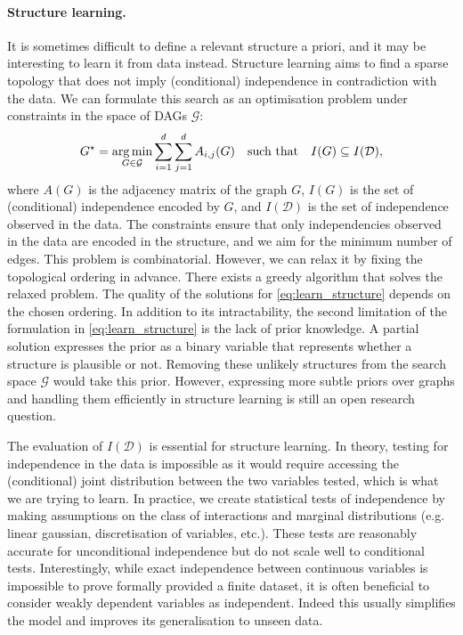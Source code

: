 \paragraph{Structure learning.}
It is sometimes difficult to define a relevant structure a priori, and it may be interesting to learn it from data instead. Structure learning aims to find a sparse topology that does not imply (conditional) independence in contradiction with the data. We can formulate this search as an optimisation problem under constraints in the space of DAGs $\mathcal{G}$:
\begin{align}
 G^\star = \operatorname*{arg\,min}_{G \in \mathcal{G}} \sum_{i=1}^d\sum_{j=1}^d A_{i,j}(G) \quad \text{such that} \quad I(G) \subseteq I(\mathcal{D}), \label{eq:learn_structure}
\end{align}
where $A(G)$ is the adjacency matrix of the graph $G$, $I(G)$ is the set of (conditional) independence encoded by $G$, and $I(\mathcal{D})$ is the set of independence observed in the data. The constraints ensure that only independencies observed in the data are encoded in the structure, and we aim for the minimum number of edges. This problem is combinatorial. However, we can relax it by fixing the topological ordering in advance. There exists a greedy algorithm that solves the relaxed problem. The quality of the solutions for \eqref{eq:learn_structure} depends on the chosen ordering. In addition to its intractability, the second limitation of the formulation in \eqref{eq:learn_structure} is the lack of prior knowledge. A partial solution expresses the prior as a binary variable that represents whether a structure is plausible or not. Removing these unlikely structures from the search space $\mathcal{G}$ would take this prior. However, expressing more subtle priors over graphs and handling them efficiently in structure learning is still an open research question.

The evaluation of $I(\mathcal{D})$ is essential for structure learning. In theory, testing for independence in the data is impossible as it would require accessing the (conditional) joint distribution between the two variables tested, which is what we are trying to learn. In practice, we create statistical tests of independence by making assumptions on the class of interactions and marginal distributions (e.g. linear gaussian, discretisation of variables, etc.). These tests are reasonably accurate for unconditional independence but do not scale well to conditional tests. Interestingly, while exact independence between continuous variables is impossible to prove formally provided a finite dataset, it is often beneficial to consider weakly dependent variables as independent. Indeed this usually simplifies the model and improves its generalisation to unseen data.

